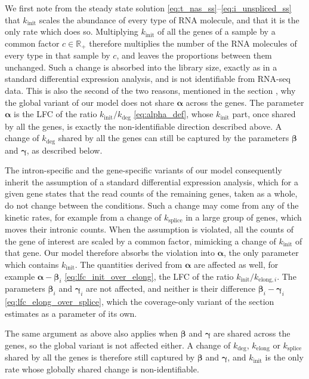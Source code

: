 \documentclass[11pt]{article}
\begin{document}
	We first note from the steady state solution \eqref{eq:t_nas_ss}--\eqref{eq:i_unspliced_ss} that $k_{\mathrm{init}}$ scales the abundance of every type of RNA molecule, and that it is the only rate which does so. Multiplying $k_{\mathrm{init}}$ of all the genes of a sample by a common factor $c \in \mathbb{R}_+$ therefore multiplies the number of the RNA molecules of every type in that sample by $c$, and leaves the proportions between them unchanged. Such a change is absorbed into the library size, exactly as in a standard differential expression analysis, and is not identifiable from RNA-seq data. This is also the second of the two reasons, mentioned in the section , why the global variant of our model does not share $\boldsymbol{\alpha}$ across the genes. The parameter $\boldsymbol{\alpha}$ is the LFC of the ratio $k_{\mathrm{init}} / k_{\mathrm{deg}}$ \eqref{eq:alpha_def}, whose $k_{\mathrm{init}}$ part, once shared by all the genes, is exactly the non-identifiable direction described above. A change of $k_{\mathrm{deg}}$ shared by all the genes can still be captured by the parameters $\boldsymbol{\beta}$ and $\boldsymbol{\gamma}$, as described below.

	The intron-specific and the gene-specific variants of our model consequently inherit the assumption of a standard differential expression analysis, which for a given gene states that the read counts of the remaining genes, taken as a whole, do not change between the conditions. Such a change may come from any of the kinetic rates, for example from a change of $k_{\mathrm{splice}}$ in a large group of genes, which moves their intronic counts. When the assumption is violated, all the counts of the gene of interest are scaled by a common factor, mimicking a change of $k_{\mathrm{init}}$ of that gene. Our model therefore absorbs the violation into $\boldsymbol{\alpha}$, the only parameter which contains $k_{\mathrm{init}}$. The quantities derived from $\boldsymbol{\alpha}$ are affected as well, for example $\boldsymbol{\alpha} - \boldsymbol{\beta}_i$ \eqref{eq:lfc_init_over_elong}, the LFC of the ratio $k_{\mathrm{init}} / k_{\mathrm{elong},i}$. The parameters $\boldsymbol{\beta}_i$ and $\boldsymbol{\gamma}_i$ are not affected, and neither is their difference $\boldsymbol{\beta}_i - \boldsymbol{\gamma}_i$ \eqref{eq:lfc_elong_over_splice}, which the coverage-only variant of the section  estimates as a parameter of its own.

	The same argument as above also applies when $\boldsymbol{\beta}$ and $\boldsymbol{\gamma}$ are shared across the genes, so the global variant is not affected either. A change of $k_{\mathrm{deg}}$, $k_{\mathrm{elong}}$ or $k_{\mathrm{splice}}$ shared by all the genes is therefore still captured by $\boldsymbol{\beta}$ and $\boldsymbol{\gamma}$, and $k_{\mathrm{init}}$ is the only rate whose globally shared change is non-identifiable.
\end{document}
